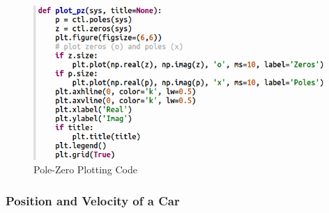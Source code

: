 \begin{figure}[H]
\centering
\includegraphics[width=0.8\linewidth]{Figures/pole_zero_code.png}
\caption{Pole-Zero Plotting Code}
\label{f:pole_zero_code}
\end{figure}

\subsubsection{Position and Velocity of a Car}

